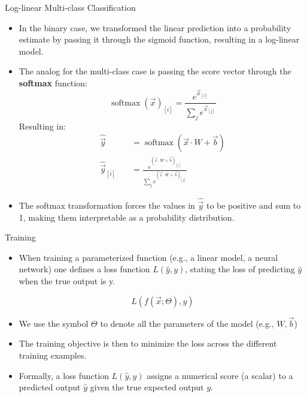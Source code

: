\documentclass[handout]{beamer}
\begin{document}
\begin{frame}{Log-linear Multi-class Classification}

\begin{scriptsize}
\begin{itemize}
\item In the binary case, we transformed the linear prediction into a probability estimate by passing it through the sigmoid function, resulting in a log-linear model.
\item The analog for the multi-class case is passing the score vector through the \textbf{softmax} function:
\begin{equation}
 \operatorname{softmax}(\vec{x})_{[i]} = \frac{e^{\vec{x}_{[i]}}}{\sum_j e^{\vec{x}_{[j]}}}
\end{equation}
Resulting in:
\begin{equation}
\begin{split}
\hat{\vec{y}} \quad & =  \operatorname{softmax}(\vec{x} \cdot W + \vec{b})  \\
\hat{\vec{y}}_{[i]} \quad & = \frac{e^{(\vec{x} \cdot W + \vec{b})_{[i]}}}{\sum_j e^{(\vec{x} \cdot W + \vec{b})_{[j]}}}
\end{split}
\end{equation}
\item The softmax transformation forces the values in $\hat{\vec{y}}$ to be positive and sum to 1, making them interpretable as a probability distribution.
\end{itemize}
\end{scriptsize}
\end{frame}





\begin{frame}{Training}
\begin{scriptsize}
\begin{itemize}
\item  When training a parameterized function (e.g., a linear model, a neural network) one defines a loss function $L(\hat{y}, y)$, stating the loss of predicting $\hat{y}$ when the true output is y.

\begin{displaymath}
L(f(\vec{x};\Theta), y) 
\end{displaymath}

\item We use the symbol $\Theta$ to denote all the parameters of the model (e.g.,  $W, \vec{b}$)

\item The training objective is then to minimize the loss across the different training examples. 


\item Formally, a loss function $L(\hat{y},y)$ assigns a numerical score (a scalar) to a predicted output $\hat{y}$ given the true expected output $y$. 

\end{itemize}
\end{scriptsize}
\end{frame}
\end{document}
